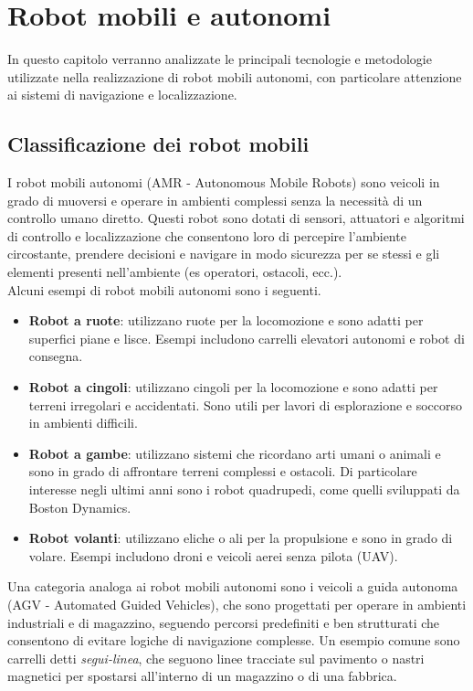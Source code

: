 \chapter{Robot mobili e autonomi}
In questo capitolo verranno analizzate le principali tecnologie e metodologie utilizzate nella realizzazione di robot mobili autonomi, con particolare attenzione ai sistemi di navigazione e localizzazione.

\section{Classificazione dei robot mobili}
I robot mobili autonomi (AMR - Autonomous Mobile Robots) sono veicoli in grado di muoversi e operare in ambienti complessi senza la necessità di un controllo umano diretto. Questi robot sono dotati di sensori, attuatori e algoritmi di controllo e localizzazione che consentono loro di percepire l'ambiente circostante, prendere decisioni e navigare in modo sicurezza per se stessi e gli elementi presenti nell'ambiente (es operatori, ostacoli, ecc.).\\
Alcuni esempi di robot mobili autonomi sono i seguenti.
\begin{itemize}
    \item \textbf{Robot a ruote}: utilizzano ruote per la locomozione e sono adatti per superfici piane e lisce. Esempi includono carrelli elevatori autonomi e robot di consegna.
    \item \textbf{Robot a cingoli}: utilizzano cingoli per la locomozione e sono adatti per terreni irregolari e accidentati. Sono utili per lavori di esplorazione e soccorso in ambienti difficili.
    \item \textbf{Robot a gambe}: utilizzano sistemi che ricordano arti umani o animali e sono in grado di affrontare terreni complessi e ostacoli. Di particolare interesse negli ultimi anni sono i robot quadrupedi, come quelli sviluppati da Boston Dynamics.
    \item \textbf{Robot volanti}: utilizzano eliche o ali per la propulsione e sono in grado di volare. Esempi includono droni e veicoli aerei senza pilota (UAV).
\end{itemize}

Una categoria analoga ai robot mobili autonomi sono i veicoli a guida autonoma (AGV - Automated Guided Vehicles), che sono progettati per operare in ambienti industriali e di magazzino, seguendo percorsi predefiniti e ben strutturati che consentono di evitare logiche di navigazione complesse. Un esempio comune sono carrelli detti \textit{segui-linea}, che seguono linee tracciate sul pavimento o nastri magnetici per spostarsi all'interno di un magazzino o di una fabbrica.

